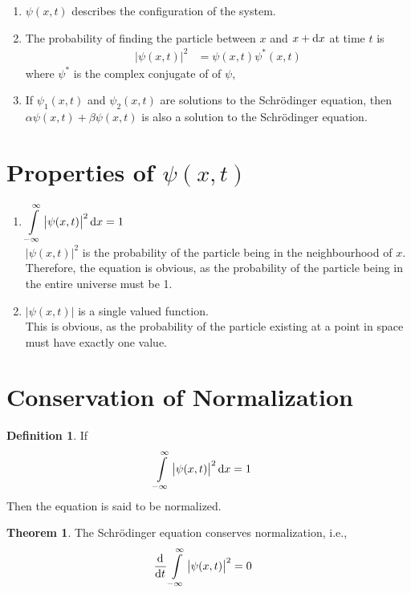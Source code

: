 \documentclass[titlepage, fleqn, a4paper, 12pt, twoside]{article}
\theoremstyle{definition}
\newtheorem{definition}{Definition}
\theoremstyle{theorem}
\newtheorem{theorem}{Theorem}
\begin{document}
\begin{enumerate}
	\item
		$\psi(x,t)$ describes the configuration of the system.
	\item
		The probability of finding the particle between $x$ and $x + \dif x$ at time $t$ is
		\begin{align*}
			\left| \psi(x,t) \right|^2 & = \psi(x,t) \psi^*(x,t)
		\end{align*}
		where $\psi^*$ is the complex conjugate of of $\psi$,
	\item
		If $\psi_1(x,t)$ and $\psi_2(x,t)$ are solutions to the Schrödinger equation, then $\alpha \psi(x,t) + \beta \psi(x,t)$ is also a solution to the Schrödinger equation.
\end{enumerate}

\section{Properties of $\psi(x,t)$}

\begin{enumerate}
	\item
		$\displaystyle \int\limits_{-\infty}^{\infty} \left| \psi(x,t) \right|^2 \dif x = 1$\\
		$\left| \psi(x,t) \right|^2$ is the probability of the particle being in the neighbourhood of $x$.
		Therefore, the equation is obvious, as the probability of the particle being in the entire universe must be 1.
	\item
		$\left| \psi(x,t) \right|$ is a single valued function.\\
		This is obvious, as the probability of the particle existing at a point in space must have exactly one value.
\end{enumerate}

\section{Conservation of Normalization}

\begin{definition}
	If
	\begin{align*}
		\int\limits_{-\infty}^{\infty} \left| \psi(x,t) \right|^2 \dif x & = 1
	\end{align*}
	Then the equation is said to be normalized.
\end{definition}

\begin{theorem}
	The Schrödinger equation conserves normalization, i.e.,
	\begin{align*}
		\dod{}{t} \int\limits_{-\infty}^{\infty} \left| \psi(x,t) \right|^2 & = 0
	\end{align*}
\end{theorem}
\end{document}
